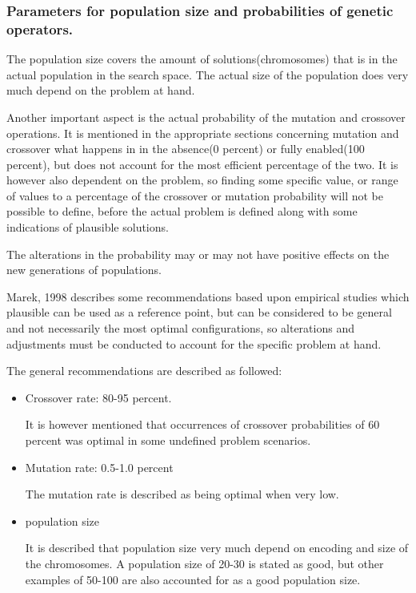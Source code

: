 \subsubsection{Parameters for population size and probabilities of genetic operators.}\label{ssub:population}


The population size covers the amount of solutions(chromosomes) that is in the actual population in the search space. The actual size of the population does very much depend on the problem at hand.\cite[pp. 42]{Sivanandam2008}


Another important aspect is the actual probability of the mutation and crossover operations.
It is mentioned in the appropriate sections concerning mutation and crossover what happens in in the absence(0 percent) or fully enabled(100 percent), but does not account for the most efficient percentage of the two. It is however also dependent on the problem, so finding some specific value, or range of values to a percentage of the crossover or mutation probability will not be possible to define, before the actual problem is defined along with some indications of plausible solutions.

The alterations in the probability may or may not have positive effects on the new generations of populations.

Marek, 1998\cite{Marek1998}  describes some recommendations based upon empirical studies which plausible can be used as a reference point, but can be considered to be general and not necessarily the most optimal configurations, so alterations and adjustments must be conducted to account for the specific problem at hand.

The general recommendations are described as followed:
\begin{itemize}
\item Crossover rate: 80-95 percent.

It is however mentioned that occurrences of crossover probabilities of 60 percent was optimal in some undefined problem scenarios.
\item Mutation rate: 0.5-1.0 percent

The mutation rate is described as being optimal when very low.
\item population size

It is described that population size very much depend on encoding and size of the chromosomes. A population size of 20-30 is stated as good, but other examples of 50-100 are also accounted for as a good population size.
\end{itemize}

